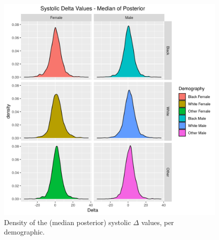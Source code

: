 \documentclass[
]{article}
\begin{document}
\begin{figure}
\hypertarget{fig:DeltaDens}{%
\centering
\includegraphics{./Rmarkdown_Plots/SysDelta_Densities_Demography.png}
\caption{Density of the (median posterior) systolic \(\Delta\) values, per demographic.}\label{fig:DeltaDens}
}
\end{figure}
\end{document}
